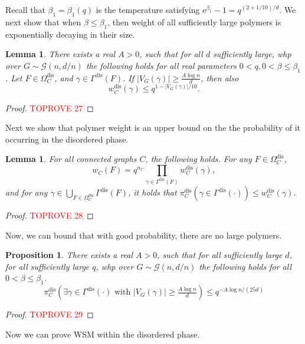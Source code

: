\documentclass[11pt]{article}
\theoremstyle{plain}
\newtheorem{lemma}[theorem]{Lemma}
\newtheorem{proposition}[theorem]{Proposition}
\newcommand{\G}{\mathcal{G}}
\newcommand{\emm}{\mathrm{e}}
\newcommand{\1}{\mathbb{1}}
\newcommand{\dis}{\mathrm{dis}}
\begin{document}
Recall that \(\beta_1 = \beta_1(q)\) is the temperature satisfying \(\emm^{\beta_1}-1 = q^{(2+1/10)/d}\). We next show that when \(\beta \leq \beta_1\), then weight of all sufficiently large polymers is exponentially decaying in their size. 

\begin{lemma}\label{lem:disordered-polymer-weight-decay}
    There exists a real \(A > 0\), such that for all \(d\) sufficiently large, whp over \(G\sim\G(n,d/n)\) the following holds for all real parameters \(0 <q, 0 < \beta \leq \beta_1\). Let \(F\in\Omega_C^\dis\), and \(\gamma\in\Gamma^\dis(F)\). If \(|V_G(\gamma)|\geq\frac{A\log n}{d}\), then also \[w^\dis_C(\gamma) \leq q^{1-|V_G(\gamma)|/10}.\]
\end{lemma}
\begin{proof}\textcolor{red}{TOPROVE 27}\end{proof}



Next we show that polymer weight is an upper bound on the the probability of it occurring in the disordered phase.

\begin{lemma}
    For all connected graphs \(C\), the following holds. For any \(F\in\Omega^\dis_C\),
    \[
w_C(F)=q^{n_C}\prod_{\gamma\in\Gamma^\dis(F)} w^\dis_C(\gamma),
    \]and for any \(\gamma\in\bigcup_{F\in\Omega_C^\dis}\Gamma^\dis(F)\), it holds that $\pi^\dis_C(\gamma\in\Gamma^\dis(\cdot))\leq w^\dis_C(\gamma).$
\end{lemma}
\begin{proof}\textcolor{red}{TOPROVE 28}\end{proof}

Now, we can bound that with good probability, there are no large polymers.

\begin{proposition}\label{prop:disordered-kotecky-preiss}
    There exists a real \(A > 0\), such that for all sufficiently large \(d\), for all sufficiently large \(q\), whp over \(G\sim\G(n,d/n)\) the following holds for all \(0 < \beta \leq \beta_1\).
    \[\pi^\dis_C(\exists\gamma\in\Gamma^\dis(\cdot)\text{ with }|V_G(\gamma)|\geq\tfrac{A\log n}{d}) \leq q^{-A\log n/(25d)}
    \]
\end{proposition}
\begin{proof}\textcolor{red}{TOPROVE 29}\end{proof}

Now we can prove WSM within the disordered phase.
\end{document}
